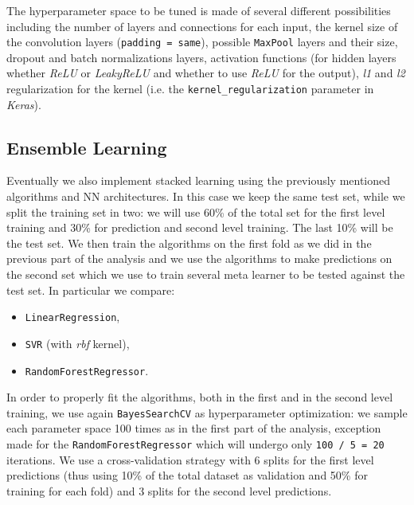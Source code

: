     The hyperparameter space to be tuned is made of several different possibilities including the number of layers and connections for each input, the kernel size of the convolution layers (\texttt{padding = same}), possible \texttt{MaxPool} layers and their size, dropout and batch normalizations layers, activation functions (for hidden layers whether \textit{ReLU} or \textit{LeakyReLU} and whether to use \textit{ReLU} for the output), \textit{l1} and \textit{l2} regularization for the kernel (i.e. the \texttt{kernel\_regularization} parameter in \textit{Keras}). 
    
\subsection{Ensemble Learning}\label{sec:ensemble_desc}
    Eventually we also implement stacked learning using the previously mentioned algorithms and NN architectures. In this case we keep the same test set, while we split the training set in two: we will use 60\% of the total set for the first level training and 30\% for prediction and second level training. The last 10\% will be the test set. We then train the algorithms on the first fold as we did in the previous part of the analysis and we use the algorithms to make predictions on the second set which we use to train several meta learner to be tested against the test set. In particular we compare:
    \begin{itemize}
        \item \texttt{LinearRegression},
        \item \texttt{SVR} (with \textit{rbf} kernel),
        \item \texttt{RandomForestRegressor}.
    \end{itemize}
    In order to properly fit the algorithms, both in the first and in the second level training, we use again \texttt{BayesSearchCV} as hyperparameter optimization: we sample each parameter space 100 times as in the first part of the analysis, exception made for the \texttt{RandomForestRegressor}  which will undergo only \texttt{100 / 5 = 20} iterations. We use a cross-validation strategy with 6 splits for the first level predictions (thus using 10\% of the total dataset as validation and 50\% for training for each fold) and 3 splits for the second level predictions.